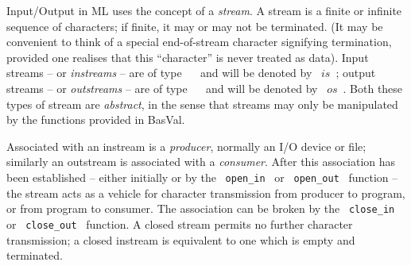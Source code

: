 Input/Output in ML uses the concept of a {\sl stream}. A stream is a finite or
infinite sequence of characters; if finite, it may or may not be terminated.
(It may be convenient to think of a special end-of-stream character
signifying termination, provided one realises that this ``character'' is
never treated as data).
Input streams -- or {\sl instreams} --
are of type ~\INSTREAM~ and will be denoted by ~$is$~;
output streams -- or {\sl outstreams} -- are of type ~\OUTSTREAM~ and will
be denoted by ~$os$~. Both these types of stream are {\sl abstract}, in the
sense that streams may only be manipulated by the functions provided in
BasVal.

Associated with an instream is a {\sl producer}, normally an I/O device or
file; similarly an outstream is associated with a {\sl consumer}.  After this
association has been established -- either initially or by the ~{\tt open\_in}~
or ~{\tt open\_out}~ function -- the stream acts as a vehicle for character
transmission from producer to program, or from program to consumer.
The association can be broken by the ~{\tt close\_in}~ or ~{\tt close\_out}~
function.
A closed stream permits no further character transmission; a closed
instream is equivalent to one which is empty and terminated.

